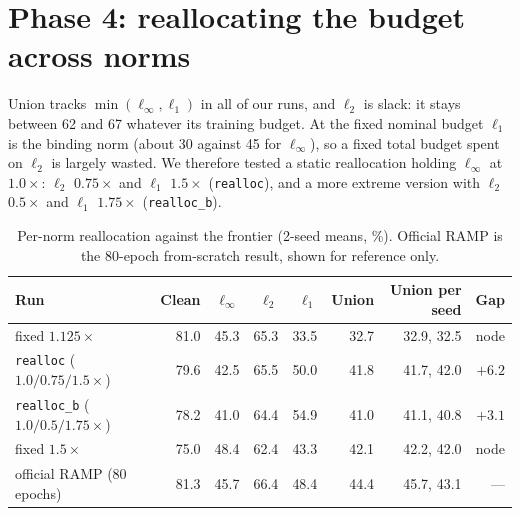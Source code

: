 \documentclass[11pt]{article}
\begin{document}
\section{Phase 4: reallocating the budget across norms}\label{sec:realloc}
Union tracks $\min(\ell_\infty,\ell_1)$ in all of our runs, and $\ell_2$ is slack: it stays between 62 and 67 whatever its training budget. At the fixed nominal budget $\ell_1$ is the binding norm (about 30 against 45 for $\ell_\infty$), so a fixed total budget spent on $\ell_2$ is largely wasted.
We therefore tested a static reallocation holding $\ell_\infty$ at $1.0\times$: $\ell_2$ $0.75\times$ and $\ell_1$ $1.5\times$ (\texttt{realloc}), and a more extreme version with $\ell_2$ $0.5\times$ and $\ell_1$ $1.75\times$ (\texttt{realloc\_b}).

\begin{table}[h]\centering\small
\caption{Per-norm reallocation against the frontier (2-seed means, \%). Official RAMP is the 80-epoch from-scratch result, shown for reference only.}\label{tab:realloc}
\begin{tabular}{lrrrrrrr}\toprule
Run & Clean & $\ell_\infty$ & $\ell_2$ & $\ell_1$ & Union & Union per seed & Gap\\\midrule
fixed $1.125\times$ & 81.0 & 45.3 & 65.3 & 33.5 & 32.7 & 32.9, 32.5 & node\\
\texttt{realloc} ($1.0/0.75/1.5\times$) & 79.6 & 42.5 & 65.5 & 50.0 & 41.8 & 41.7, 42.0 & $+6.2$\\
\texttt{realloc\_b} ($1.0/0.5/1.75\times$) & 78.2 & 41.0 & 64.4 & 54.9 & 41.0 & 41.1, 40.8 & $+3.1$\\
fixed $1.5\times$ & 75.0 & 48.4 & 62.4 & 43.3 & 42.1 & 42.2, 42.0 & node\\
official RAMP (80 epochs) & 81.3 & 45.7 & 66.4 & 48.4 & 44.4 & 45.7, 43.1 & ---\\\bottomrule
\end{tabular}
\end{table}
\end{document}
